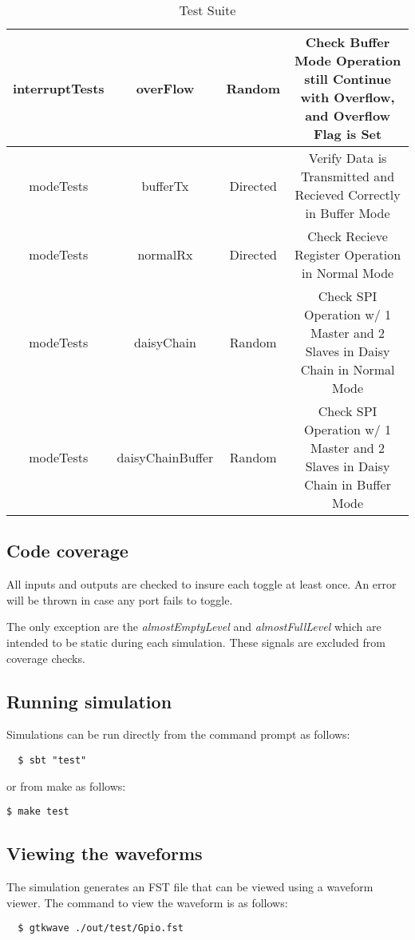 \begin{table}[h]
{\begin{tabular}{|c|c|c|c|}
      interruptTests & overFlow & Random & Check Buffer Mode Operation still Continue with Overflow, and Overflow Flag is Set \\ \hline
      modeTests & bufferTx & Directed & Verify Data is Transmitted and Recieved Correctly in Buffer Mode \\ \hline
      modeTests & normalRx & Directed & Check Recieve Register Operation in Normal Mode \\ \hline
      modeTests & daisyChain & Random & Check SPI Operation w/ 1 Master and 2 Slaves in Daisy Chain in Normal Mode \\ \hline
      modeTests & daisyChainBuffer & Random & Check SPI Operation w/ 1 Master and 2 Slaves in Daisy Chain in Buffer Mode \\ \hline
    \end{tabular}
  }
  \caption{Test Suite}
\end{table}


\subsection{Code coverage}
All inputs and outputs are checked to insure each toggle at least once. An error
will be thrown in case any port fails to toggle.

The only exception are the \emph{almostEmptyLevel} and \emph{almostFullLevel}
which are intended to be static during each simulation. These signals are
excluded from coverage checks.

\subsection{Running simulation}

Simulations can be run directly from the command prompt as follows:

\begin{verbatim}
  $ sbt "test"
\end{verbatim}

or from make as follows:

\texttt{\$ make test}

\subsection{Viewing the waveforms}

The simulation generates an FST file that can be viewed using a waveform viewer. The command to view the waveform is as follows:
\begin{verbatim}
  $ gtkwave ./out/test/Gpio.fst
\end{verbatim}
